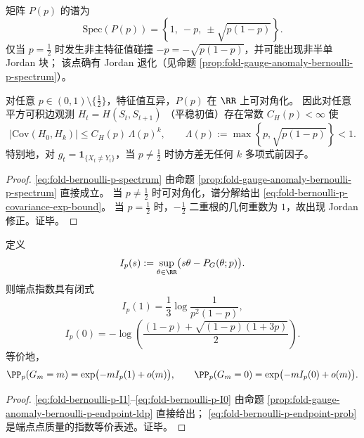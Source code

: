 \begin{proposition}\label{prop:fold-bernoulli-p-jordan-resonance-only-half}
矩阵 \(P(p)\) 的谱为
\begin{equation}\label{eq:fold-bernoulli-p-spectrum}
\mathrm{Spec}(P(p))
=\left\{1,\ -p,\ \pm\sqrt{p(1-p)}\right\}.
\end{equation}
仅当 \(p=\tfrac12\) 时发生非主特征值碰撞
\(
-p=-\sqrt{p(1-p)}
\)，并可能出现非半单 Jordan 块；
该点确有 Jordan 退化（见命题 \ref{prop:fold-gauge-anomaly-bernoulli-p-spectrum}）。

对任意 \(p\in(0,1)\setminus\{\tfrac12\}\)，特征值互异，\(P(p)\) 在 \(\RR\) 上可对角化。
因此对任意平方可积边观测
\(
H_t=H(S_t,S_{t+1})
\)
（平稳初值）存在常数 \(C_H(p)<\infty\) 使
\begin{equation}\label{eq:fold-bernoulli-p-covariance-exp-bound}
\bigl|\mathrm{Cov}(H_0,H_k)\bigr|
\le C_H(p)\,\Lambda(p)^k,\qquad
\Lambda(p):=\max\!\left\{p,\sqrt{p(1-p)}\right\}<1.
\end{equation}
特别地，对 \(g_t=\mathbf 1_{\{X_t\neq Y_t\}}\)，当 \(p\neq\tfrac12\) 时协方差无任何 \(k\) 多项式前因子。
\end{proposition}
\begin{proof}
\eqref{eq:fold-bernoulli-p-spectrum}
由命题 \ref{prop:fold-gauge-anomaly-bernoulli-p-spectrum} 直接成立。
当 \(p\neq\tfrac12\) 时可对角化，谱分解给出
\eqref{eq:fold-bernoulli-p-covariance-exp-bound}。
当 \(p=\tfrac12\) 时，\(-\tfrac12\) 二重根的几何重数为 \(1\)，故出现 Jordan 修正。证毕。
\end{proof}

\begin{theorem}[规范差密度的大偏差端点指数]\label{thm:fold-bernoulli-p-endpoint-ldp-restated}
定义
\[
I_p(s):=\sup_{\theta\in\RR}\bigl(s\theta-P_G(\theta;p)\bigr).
\]
则端点指数具有闭式
\begin{equation}\label{eq:fold-bernoulli-p-I1}
I_p(1)=\frac13\log\frac{1}{p^2(1-p)},
\end{equation}
\begin{equation}\label{eq:fold-bernoulli-p-I0}
I_p(0)=
-\log\!\left(\frac{(1-p)+\sqrt{(1-p)(1+3p)}}{2}\right).
\end{equation}
等价地，
\begin{equation}\label{eq:fold-bernoulli-p-endpoint-prob}
\PP_p(G_m=m)=\exp\bigl(-mI_p(1)+o(m)\bigr),\qquad
\PP_p(G_m=0)=\exp\bigl(-mI_p(0)+o(m)\bigr).
\end{equation}
\end{theorem}
\begin{proof}
\eqref{eq:fold-bernoulli-p-I1}--\eqref{eq:fold-bernoulli-p-I0}
由命题 \ref{prop:fold-gauge-anomaly-bernoulli-p-endpoint-ldp} 直接给出；
\eqref{eq:fold-bernoulli-p-endpoint-prob} 是端点点质量的指数等价表述。证毕。
\end{proof}

